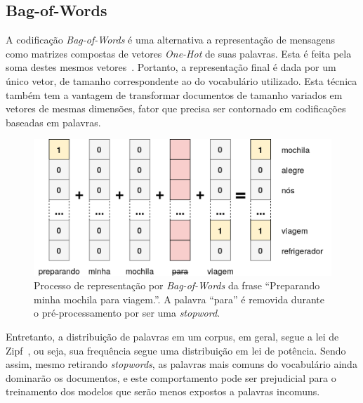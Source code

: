 \subsection{Bag-of-Words}

A codificação \textit{Bag-of-Words} é uma alternativa a representação de
mensagens como matrizes compostas de vetores \textit{One-Hot} de suas palavras.
Esta é feita pela soma destes mesmos vetores~\cite{manning10}.
Portanto, a representação final é dada por um único vetor, de tamanho
correspondente ao do vocabulário utilizado.
Esta técnica também tem a vantagem de transformar documentos de tamanho variados
em vetores de mesmas dimensões, fator que precisa ser contornado em codificações
baseadas em palavras.

\begin{figure}[h]
\begin{center} {
    \begin{center}
    \includegraphics[scale=0.30]{images/bag_of_words.png}
    \caption{Processo de representação por \textit{Bag-of-Words} da frase
             ``Preparando minha mochila para viagem.''.
             A palavra ``para'' é removida durante o pré-processamento por
             ser uma \textit{stopword}.}
    \label{fig:bag_of_words}
    \end{center}
}
\end{center}
\end{figure}

Entretanto, a distribuição de palavras em um corpus, em geral, segue a lei de
Zipf~\cite{powers98}, ou seja, sua frequência segue uma distribuição em lei de
potência.
Sendo assim, mesmo retirando \textit{stopwords}, as palavras mais comuns do
vocabulário ainda dominarão os documentos, e este comportamento pode ser
prejudicial para o treinamento dos modelos que serão menos expostos a palavras
incomuns.



